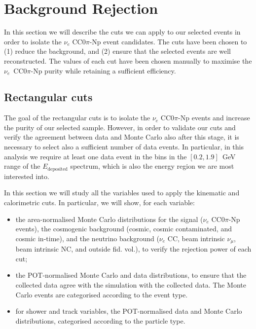 \section{Background Rejection}\label{sec:bkg}
In this section we will describe the cuts we can apply to our selected events in order to isolate the $\nu_{e}$ CC$0\pi$-Np event candidates. The cuts have been chosen to (1) reduce the background, and (2) ensure that the selected events are well reconstructed. The values of each cut have been chosen manually to maximise the $\nu_e$~CC0$\pi$-Np purity while retaining a sufficient efficiency. %


\subsection{Rectangular cuts}\label{sec:cuts}
The goal of the rectangular cuts is to isolate the $\nu_e$ CC0$\pi$-Np events and increase the purity of our selected sample. However, in order to validate our cuts and verify the agreement between data and Monte Carlo also after this stage, it is necessary to select also a sufficient number of data events. In particular, in this analysis we require at least one data event in the bins in the $[0.2,1.9]$~GeV range of the $E_{\mathrm{deposited}}$ spectrum, which is also the energy region we are most interested into. 

In this section we will study all the variables used to apply the kinematic and calorimetric cuts. In particular, we will show, for each variable:
\begin{itemize}
\item the area-normalised Monte Carlo distributions for the signal ($\nu_{e}$ CC0$\pi$-Np events), the cosmogenic background (cosmic, cosmic contaminated, and cosmic in-time), and the neutrino background ($\nu_{e}$ CC, beam intrinsic $\nu_{\mu}$, beam intrinsic NC, and outside fid. vol.), to verify the rejection power of each cut;
\item the POT-normalised Monte Carlo and data distributions, to ensure that the collected data agree with the simulation with the collected data. The Monte Carlo events are categorised according to the event type.
\item for shower and track variables, the POT-normalised data and Monte Carlo distributions, categorised according to the particle type.
\end{itemize}

